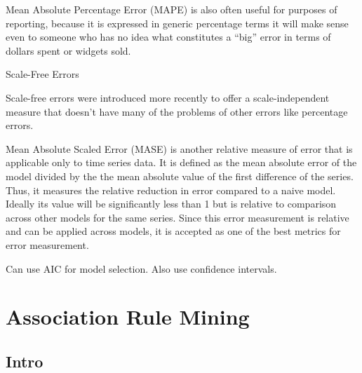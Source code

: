 \documentclass[]{book}
\theoremstyle{definition}
\theoremstyle{definition}
\theoremstyle{definition}
\theoremstyle{remark}
\begin{document}
Mean Absolute Percentage Error (MAPE) is also often useful for purposes
of reporting, because it is expressed in generic percentage terms it
will make sense even to someone who has no idea what constitutes a
``big'' error in terms of dollars spent or widgets sold.

Scale-Free Errors

Scale-free errors were introduced more recently to offer a
scale-independent measure that doesn't have many of the problems of
other errors like percentage errors.

Mean Absolute Scaled Error (MASE) is another relative measure of error
that is applicable only to time series data. It is defined as the mean
absolute error of the model divided by the the mean absolute value of
the first difference of the series. Thus, it measures the relative
reduction in error compared to a naive model. Ideally its value will be
significantly less than 1 but is relative to comparison across other
models for the same series. Since this error measurement is relative and
can be applied across models, it is accepted as one of the best metrics
for error measurement.

Can use AIC for model selection. Also use confidence intervals.

\section{Association Rule Mining}\label{association-rule-mining}

\subsection{Intro}\label{intro-15}
\end{document}
